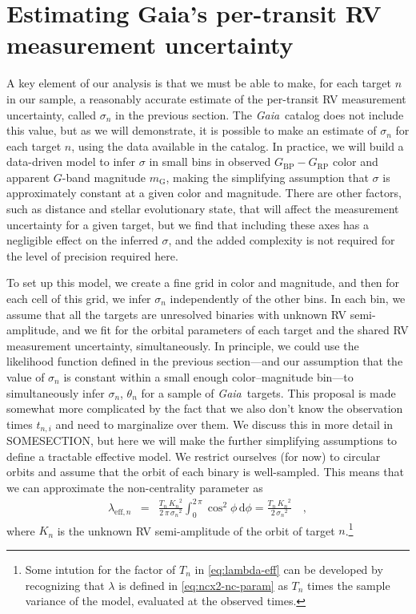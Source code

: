 \documentclass[modern, letterpaper]{aastex631}
\newcommand{\project}[1]{\textsl{#1}}
\newcommand{\Gaia}{\project{Gaia}}
\newcommand{\dd}{\ensuremath{\,\mathrm{d}}}
\begin{document}
\section{Estimating Gaia's per-transit RV measurement uncertainty}\label{sec:noise}

A key element of our analysis is that we must be able to make, for each target $n$ in our sample, a reasonably accurate estimate of the per-transit RV measurement uncertainty, called $\sigma_n$ in the previous section.
The \Gaia\ catalog does not include this value, but as we will demonstrate, it is possible to make an estimate of $\sigma_n$ for each target $n$, using the data available in the catalog.
In practice, we will build a data-driven model to infer $\sigma$ in small bins in observed $G_\mathrm{BP} - G_\mathrm{RP}$ color and apparent $G$-band magnitude $m_\mathrm{G}$, making the simplifying assumption that $\sigma$ is approximately constant at a given color and magnitude.
There are other factors, such as distance and stellar evolutionary state, that will affect the measurement uncertainty for a given target, but we find that including these axes has a negligible effect on the inferred $\sigma$, and the added complexity is not required for the level of precision required here.

To set up this model, we create a fine grid in color and magnitude, and then for each cell of this grid, we infer $\sigma_n$ independently of the other bins.
In each bin, we assume that all the targets are unresolved binaries with unknown RV semi-amplitude, and we fit for the orbital parameters of each target and the shared RV measurement uncertainty, simultaneously.
In principle, we could use the likelihood function defined in the previous section---and our assumption that the value of $\sigma_n$ is constant within a small enough color--magnitude bin---to simultaneously infer $\sigma_n$, $\theta_n$ for a sample of \Gaia\ targets.
This proposal is made somewhat more complicated by the fact that we also don't know the observation times $t_{n,i}$ and need to marginalize over them.
We discuss this in more detail in SOMESECTION, but here we will make the further simplifying assumptions to define a tractable effective model.
We restrict ourselves (for now) to circular orbits and assume that the orbit of each binary is well-sampled.
This means that we can approximate the non-centrality parameter as
\begin{eqnarray}
	\lambda_{\mathrm{eff},n} &=& \frac{T_n\,{K_n}^2}{2\,\pi\,{\sigma_n}^2}\int_{0}^{2\,\pi} \cos^2\phi \dd\phi = \frac{T_n\,{K_n}^2}{2\,{\sigma_n}^2} \quad,
	\label{eq:lambda-eff}
\end{eqnarray}
where $K_n$ is the unknown RV semi-amplitude of the orbit of target $n$.\footnote{Some intution for the factor of $T_n$ in \autoref{eq:lambda-eff} can be developed by recognizing that $\lambda$ is defined in \ref{eq:ncx2-nc-param} as $T_n$ times the sample variance of the model, evaluated at the observed times.}
\end{document}
